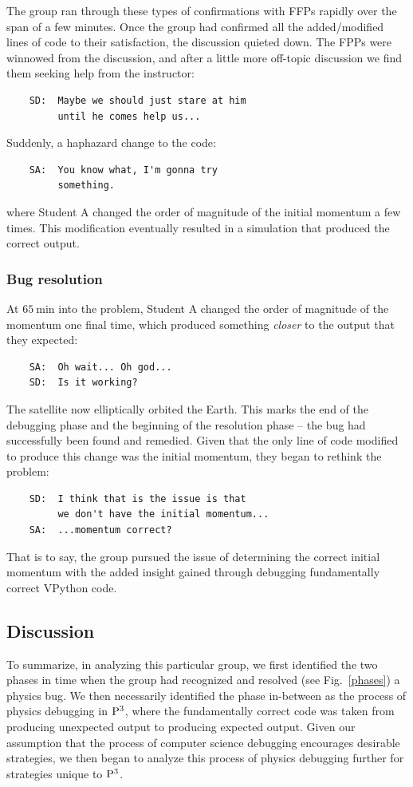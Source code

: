 \documentclass{msuphddissertation}
\begin{document}
\begin{doublespace}
The group ran through these types of confirmations with FFPs rapidly over the span of a few minutes.  Once the group had confirmed all the added/modified lines of code to their satisfaction, the discussion quieted down.  The FPPs were winnowed from the discussion, and after a little more off-topic discussion we find them seeking help from the instructor:  \begin{verbatim}
    SD:  Maybe we should just stare at him
         until he comes help us...
\end{verbatim} Suddenly, a haphazard change to the code:  \begin{verbatim}
    SA:  You know what, I'm gonna try
         something.
\end{verbatim} where Student A changed the order of magnitude of the initial momentum a few times.  This modification eventually resulted in a simulation that produced the correct output.

\subsubsection{Bug resolution}

At $\SI{65}{\minute}$ into the problem, Student A changed the order of magnitude of the momentum one final time, which produced something \emph{closer} to the output that they expected:  \begin{verbatim}
    SA:  Oh wait... Oh god...
    SD:  Is it working?
\end{verbatim}  The satellite now elliptically orbited the Earth.  This marks the end of the debugging phase and the beginning of the resolution phase -- the bug had successfully been found and remedied.  Given that the only line of code modified to produce this change was the initial momentum, they began to rethink the problem:  \begin{verbatim}
    SD:  I think that is the issue is that
         we don't have the initial momentum...
    SA:  ...momentum correct?
\end{verbatim}  That is to say, the group pursued the issue of determining the correct initial momentum with the added insight gained through debugging fundamentally correct VPython code.

\subsection{Discussion}

To summarize, in analyzing this particular group, we first identified the two phases in time when the group had recognized and resolved (see Fig.~\ref{phases}) a physics bug.  We then necessarily identified the phase in-between as the process of physics debugging in ${\rm P}^{3}$, where the fundamentally correct code was taken from producing unexpected output to producing expected output.  Given our assumption that the process of computer science debugging encourages desirable strategies, we then began to analyze this process of physics debugging further for strategies unique to ${\rm P}^{3}$.


\end{doublespace}
\end{document}
